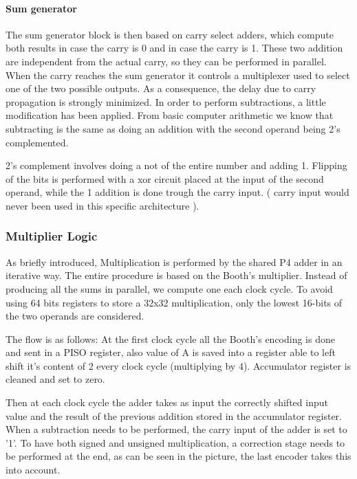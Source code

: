 \documentclass[12pt]{article}
\begin{document}
\paragraph{Sum generator}The sum generator block is then based on carry select adders, which compute both results in case the carry is 0 and in case the carry is 1. These two addition are independent from the actual carry, so they can be performed in parallel. When the carry reaches the sum generator it controls a multiplexer used to select one of the two possible outputs.
As a consequence, the delay due to carry propagation is strongly minimized.
\newline
\newline
In order to perform subtractions, a little modification has been applied. From basic computer arithmetic we know that subtracting is the same as doing an addition with the second operand being 2's complemented.

2's complement involves doing a not of the entire number and adding 1.
Flipping of the bits is performed with a xor circuit placed at the input of the second operand, while the 1 addition is done trough the carry input. ( carry input would never been used in this specific architecture ). 



\subsubsection{Multiplier Logic}
As briefly introduced, Multiplication is performed by the shared P4 adder in an iterative way.
The entire procedure is based on the Booth's multiplier. Instead of producing all the sums in parallel, we compute one each clock cycle.
To avoid using 64 bits registers to store a 32x32 multiplication, only the lowest 16-bits of the two operands are considered.

The flow is as follows:
At the first clock cycle all the Booth's encoding is done and sent in a PISO register, also value of A is saved into a register able to left shift it's content of 2 every clock cycle (multiplying by 4). Accumulator register is cleaned and set to zero.

Then at each clock cycle the adder takes as input the correctly shifted input value and the result of the previous addition stored in the accumulator register. When a subtraction needs to be performed, the carry input of the adder is set to '1'.
To have both signed and unsigned multiplication, a correction stage needs to be performed at the end, as can be seen in the picture, the last encoder takes this into account.
\end{document}
